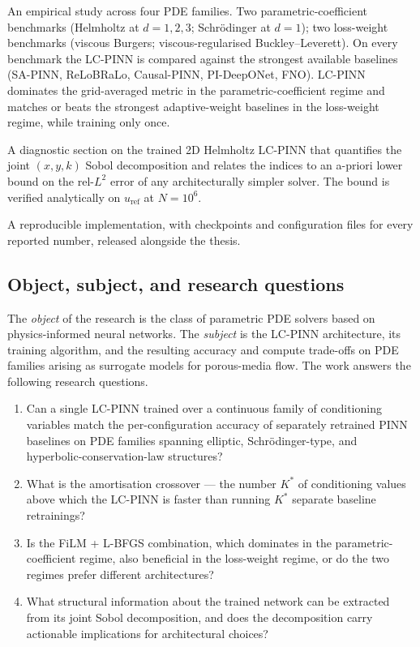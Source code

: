 \documentclass[12pt,a4paper]{extarticle}
\begin{document}
An empirical study across four PDE families. Two parametric-coefficient benchmarks (Helmholtz at $d = 1, 2, 3$; Schr\"{o}dinger at $d = 1$); two loss-weight benchmarks (viscous Burgers; viscous-regularised Buckley--Leverett). On every benchmark the LC-PINN is compared against the strongest available baselines (SA-PINN, ReLoBRaLo, Causal-PINN, PI-DeepONet, FNO). LC-PINN dominates the grid-averaged metric in the parametric-coefficient regime and matches or beats the strongest adaptive-weight baselines in the loss-weight regime, while training only once.

A diagnostic section on the trained 2D Helmholtz LC-PINN that quantifies the joint $(x, y, k)$ Sobol decomposition and relates the indices to an a-priori lower bound on the rel-$L^2$ error of any architecturally simpler solver. The bound is verified analytically on $u_{\mathrm{ref}}$ at $N = 10^6$.

A reproducible implementation, with checkpoints and configuration files for every reported number, released alongside the thesis.

\subsection{Object, subject, and research questions}

The \emph{object} of the research is the class of parametric PDE solvers based on physics-informed neural networks. The \emph{subject} is the LC-PINN architecture, its training algorithm, and the resulting accuracy and compute trade-offs on PDE families arising as surrogate models for porous-media flow. The work answers the following research questions.
\begin{enumerate}
    \item Can a single LC-PINN trained over a continuous family of conditioning variables match the per-configuration accuracy of separately retrained PINN baselines on PDE families spanning elliptic, Schr\"{o}dinger-type, and hyperbolic-conservation-law structures?
    \item What is the amortisation crossover --- the number $K^*$ of conditioning values above which the LC-PINN is faster than running $K^*$ separate baseline retrainings?
    \item Is the FiLM + L-BFGS combination, which dominates in the parametric-coefficient regime, also beneficial in the loss-weight regime, or do the two regimes prefer different architectures?
    \item What structural information about the trained network can be extracted from its joint Sobol decomposition, and does the decomposition carry actionable implications for architectural choices?
\end{enumerate}
\end{document}
